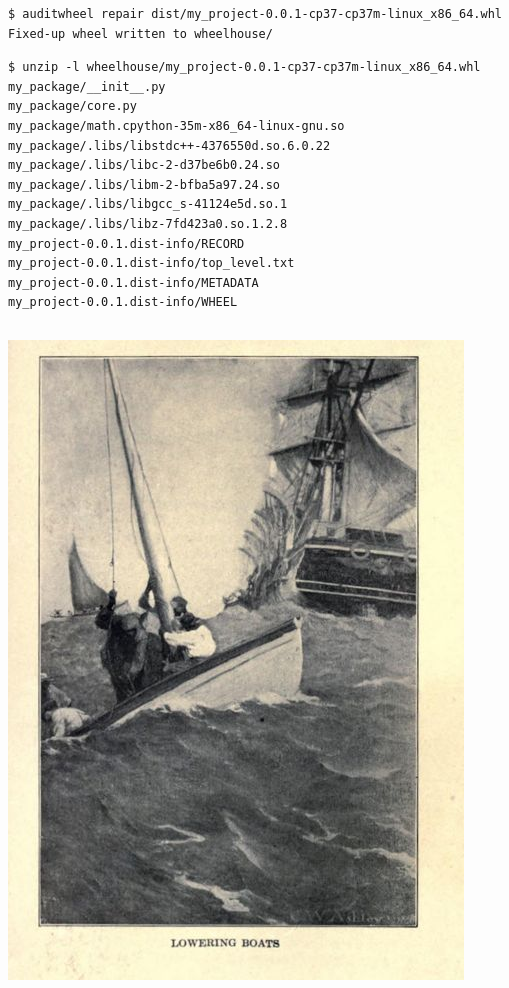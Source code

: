 \documentclass[pdf]{beamer}
\begin{document}
\begin{frame}[fragile]
    \begin{verbatim}
$ auditwheel repair dist/my_project-0.0.1-cp37-cp37m-linux_x86_64.whl
Fixed-up wheel written to wheelhouse/
    \end{verbatim}
\end{frame}

\begin{frame}[fragile]
    \begin{verbatim}
$ unzip -l wheelhouse/my_project-0.0.1-cp37-cp37m-linux_x86_64.whl
my_package/__init__.py
my_package/core.py
my_package/math.cpython-35m-x86_64-linux-gnu.so
my_package/.libs/libstdc++-4376550d.so.6.0.22
my_package/.libs/libc-2-d37be6b0.24.so
my_package/.libs/libm-2-bfba5a97.24.so
my_package/.libs/libgcc_s-41124e5d.so.1
my_package/.libs/libz-7fd423a0.so.1.2.8
my_project-0.0.1.dist-info/RECORD
my_project-0.0.1.dist-info/top_level.txt
my_project-0.0.1.dist-info/METADATA
my_project-0.0.1.dist-info/WHEEL
    \end{verbatim}
\end{frame}

\begin{frame}[fragile]
    \inputminted[highlightlines = {7-8}]{python}{my-package/scikit-scm.py}
\end{frame}

\begin{frame}
    \begin{center}
        \includegraphics[height = 0.9\textheight]{img/lowering-boats.jpg}
    \end{center}
\end{frame}
\end{document}
